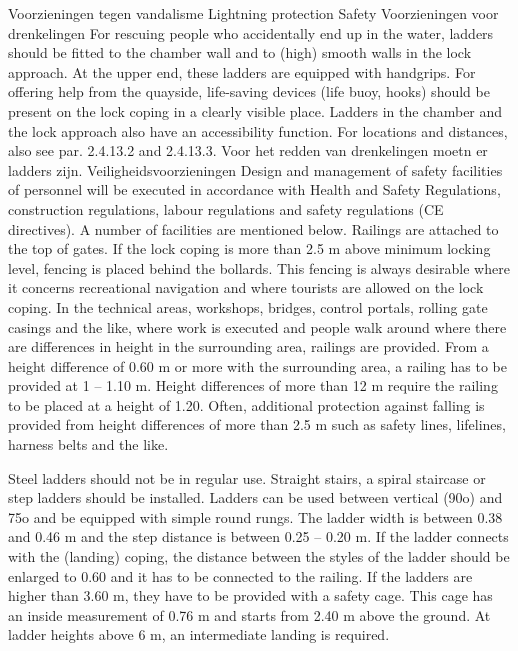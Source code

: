 Voorzieningen tegen vandalisme
Lightning protection
Safety
Voorzieningen voor drenkelingen
For rescuing people who accidentally end up in the water, ladders should be fitted to the chamber wall
and to (high) smooth walls in the lock approach. At the upper end, these ladders are equipped with
handgrips. For offering help from the quayside, life-saving devices (life buoy, hooks) should be present
on the lock coping in a clearly visible place. Ladders in the chamber and the lock approach also have an
accessibility function. For locations and distances, also see par. 2.4.13.2 and 2.4.13.3.
Voor het redden van drenkelingen moetn er ladders zijn.
Veiligheidsvoorzieningen
Design and management of safety facilities of personnel will be executed in accordance with Health and
Safety Regulations, construction regulations, labour regulations and safety regulations (CE directives).
A number of facilities are mentioned below.
Railings are attached to the top of gates. If the lock coping is more than 2.5 m above minimum locking
level, fencing is placed behind the bollards. This fencing is always desirable where it concerns recreational
navigation and where tourists are allowed on the lock coping.
In the technical areas, workshops, bridges, control portals, rolling gate casings and the like, where work
is executed and people walk around where there are differences in height in the surrounding area,
railings are provided. From a height difference of 0.60 m or more with the surrounding area, a railing
has to be provided at 1 – 1.10 m. Height differences of more than 12 m require the railing to be placed
at a height of 1.20. Often, additional protection against falling is provided from height differences of
more than 2.5 m such as safety lines, lifelines, harness belts and the like.

Steel ladders should not be in regular use. Straight stairs, a spiral staircase or step ladders should be
installed. Ladders can be used between vertical (90o) and 75o and be equipped with simple round rungs.
The ladder width is between 0.38 and 0.46 m and the step distance is between 0.25 – 0.20 m.
If the ladder connects with the (landing) coping, the distance between the styles of the ladder should be
enlarged to 0.60 and it has to be connected to the railing. If the ladders are higher than 3.60 m, they
have to be provided with a safety cage. This cage has an inside measurement of 0.76 m and starts from
2.40 m above the ground. At ladder heights above 6 m, an intermediate landing is required.


